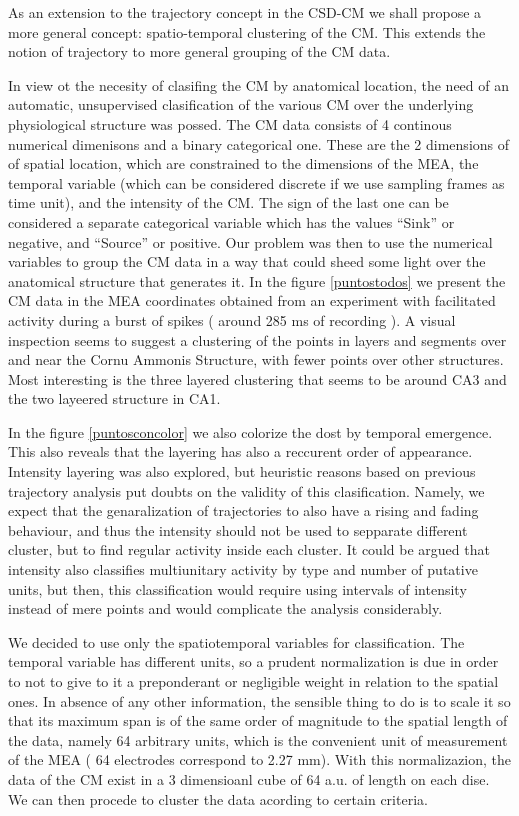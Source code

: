 As an extension to the trajectory concept in the CSD-CM we
shall propose a more general concept: spatio-temporal clustering of the CM.
This extends the notion of trajectory to more general grouping of the
CM data.

In view ot the necesity of clasifing the CM by anatomical location,
the need of an automatic, unsupervised clasification of the various CM
over the underlying physiological structure was possed.  The CM data
consists of 4 continous numerical dimenisons and a binary categorical
one. These are the 2 dimensions of of spatial location, which are constrained
to the dimensions of the MEA, the temporal variable (which can be
considered discrete if we use sampling frames as time unit), and the intensity of the CM.
The sign of the last one can be considered a separate categorical variable which
has the values ``Sink'' or negative, and ``Source'' or positive. 
Our problem was then to use the numerical variables to group the CM data in
a way that could sheed some light over the anatomical structure that
generates it. In the figure \ref{puntostodos} we present the CM data
in the MEA coordinates obtained from an experiment with facilitated activity
during a burst of spikes ( around 285 ms of recording ). A visual inspection
seems to suggest a clustering of the points in layers and segments over and near the
Cornu Ammonis Structure, with fewer points over other structures. Most interesting
is the three layered clustering that seems to be around CA3 and the two layeered
structure in CA1. 

In the figure \ref{puntosconcolor} we also colorize the dost by temporal emergence.
This also reveals that the layering has also a reccurent order of appearance. Intensity
layering was also explored, but heuristic reasons based on previous trajectory
analysis put doubts on the validity of this clasification. Namely, we expect
that the genaralization of trajectories to also have a rising and fading behaviour,
and thus the intensity should not be used to sepparate different cluster, but to
find regular activity inside each cluster. It could be argued that intensity also
classifies multiunitary activity by type and number of putative units, but then,
this classification would require using intervals of intensity instead of mere
points and would complicate the analysis considerably.

We decided to  use only the spatiotemporal variables for classification. 
The temporal variable has different units, so a prudent normalization is due
in order to not to give to it a preponderant or negligible weight in relation to the
spatial ones. In absence of any other information, the sensible thing to do is to
scale it so that its maximum span is of the same order of magnitude to the
spatial length of the data, namely 64 arbitrary units, which is the convenient unit
of measurement of the MEA ( 64 electrodes correspond to 2.27 mm).
With this normalizazion, the data of the CM exist in a 3 dimensioanl cube of 64 a.u.
of length on each dise. We can then procede to cluster the data acording to
certain criteria.

